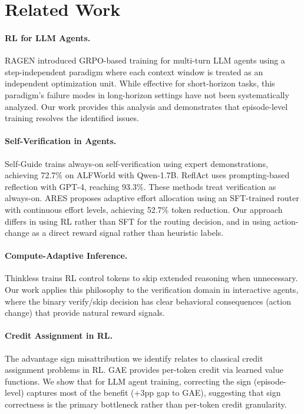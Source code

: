 \documentclass[11pt]{article}
\begin{document}
\section{Related Work}

\paragraph{RL for LLM Agents.}
RAGEN introduced GRPO-based training for multi-turn LLM agents using a step-independent paradigm where each context window is treated as an independent optimization unit. While effective for short-horizon tasks, this paradigm's failure modes in long-horizon settings have not been systematically analyzed. Our work provides this analysis and demonstrates that episode-level training resolves the identified issues.

\paragraph{Self-Verification in Agents.}
Self-Guide trains always-on self-verification using expert demonstrations, achieving 72.7\% on ALFWorld with Qwen-1.7B. ReflAct uses prompting-based reflection with GPT-4, reaching 93.3\%. These methods treat verification as always-on. ARES proposes adaptive effort allocation using an SFT-trained router with continuous effort levels, achieving 52.7\% token reduction. Our approach differs in using RL rather than SFT for the routing decision, and in using action-change as a direct reward signal rather than heuristic labels.

\paragraph{Compute-Adaptive Inference.}
Thinkless trains RL control tokens to skip extended reasoning when unnecessary. Our work applies this philosophy to the verification domain in interactive agents, where the binary verify/skip decision has clear behavioral consequences (action change) that provide natural reward signals.

\paragraph{Credit Assignment in RL.}
The advantage sign misattribution we identify relates to classical credit assignment problems in RL. GAE provides per-token credit via learned value functions. We show that for LLM agent training, correcting the sign (episode-level) captures most of the benefit (+3pp gap to GAE), suggesting that sign correctness is the primary bottleneck rather than per-token credit granularity.
\end{document}
